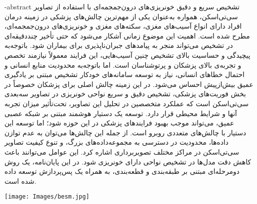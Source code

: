 


\fa-abstract{
تشخیص سریع و دقیق خونریزی‌های درون‌جمجمه‌ای با استفاده از تصاویر سی‌تی‌اسکن، همواره به‌عنوان یکی از مهم‌ترین چالش‌های پزشکی در زمینه درمان افراد دارای انواع آسیب‌های مغزی، سکته‌های مغزی و خونریزی‌های درون‌جمجمه‌ای، مطرح شده است. اهمیت این موضوع زمانی آشکار می‌شود که حتی تأخیر چنددقیقه‌ای در تشخیص می‌تواند منجر به پیامدهای جبران‌ناپذیری برای بیماران شود.
باتوجه‌به پیچیدگی و حساسیت بالای تشخیص چنین آسیب‌هایی، این فرایند معمولاً نیازمند تخصص و تجربه‌ی بالای پزشکان و پرتوشناسان است. اما باتوجه‌به محدودیت منابع انسانی و احتمال خطاهای انسانی، نیاز به توسعه سامانه‌های خودکار تشخیص مبتنی بر یادگیری عمیق بیش‌ازپیش احساس می‌شود.
در این زمینه چالش اصلی برای پزشکان خصوصاً در بخش فوریت‌های پزشکی، تشخیص دقیق و سریع نواحی خونریزی در تصاویر سه‌بعدی سی‌تی‌اسکن است که عملکرد متخصصین در تحلیل این تصاویر، تحت‌تأثیر میزان تجربه آنها و شرایط محیطی قرار دارد.
توسعه یک دستیار هوشمند مبتنی بر شبکه عصبی عمیق، می‌تواند موجب بهبود فرایندهای پزشکی در این حوزه شود؛ اما توسعه این دستیار با چالش‌های متعددی روبرو است. از جمله این چالش‌ها می‌توان به عدم توازن داده‌ها، محدودیت در دسترسی به مجموعه‌داده‌های بزرگ، و تنوع کیفیت تصاویر سی‌تی‌اسکن در مراکز مختلف تصویربرداری اشاره کرد. این عوامل می‌توانند باعث کاهش دقت مدل‌ها در تشخیص نواحی دارای خونریزی شود. در این پایان‌نامه، یک روش دومرحله‌ای مبتنی بر طبقه‌بندی و قطعه‌بندی، به همراه یک پس‌پردازش توسعه داده شده است.
 }





\KNTUtitle
\vspace*{7cm}
\thispagestyle{empty}
\begin{center}
\texttt{[image: Images/besm.jpg]}
\end{center}